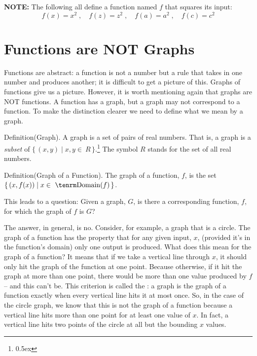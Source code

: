 {\bf NOTE:\/} The following all define a function named $f$ that squares its 
input:
$$
f(x) = x^2 \;,\quad f(z) = z^2 \;,\quad f(a) = a^2 \;,\quad f(c) = c^2 
$$

\section{Functions are NOT Graphs}
Functions are abstract: a function is not a number but a rule that takes in one number and produces another;
it is difficult to get a picture of this. Graphs of functions give us a picture. However, 
it is worth mentioning again that graphs are NOT functions. A function 
has a graph, but a graph may not correspond to a function. To make 
the distinction clearer we need to define what we mean by a graph.

\proclaim Definition(Graph). A graph is a set of pairs of real numbers.
That is, a graph is a {\it subset\/} of $\{\,(x,y)\mid x,y\in~R\,\}$.\footnote{\kern 0.5pt \raise 0.5ex \hbox{\ddag}}%
{The symbol $R$ stands for the set of all real numbers.}

\proclaim Definition(Graph of a Function). The graph of a function, $f$, 
is the set $\{\,(x,f(x)) \mid x \in~{\rm Domain}(f)\,\}$.

This leads to a question: Given a graph, $G$, is there a corresponding 
function, $f$, for which the graph of $f$ is $G$?

The answer, in general, is no. Consider, for example, a graph that 
is a circle. 
The graph of a function has the property that for any 
given input, $x$, (provided it's in the function's domain) only one output is produced. 
What does this mean for the graph
of a function? It means that if we take a vertical line through $x$, it 
should only hit the graph of the function at one point. Because otherwise, 
if it hit the graph at more than one point, there would be more than
one value produced by $f$ -- and this can't be. This criterion is called
the {\it {}\/}: a graph is the graph of a function
exactly when every vertical line hits it at most once. So, in the case of the circle
graph, we know that this is not the graph of a function because a vertical 
line hits more than one point for at least one value of $x$. In fact, a 
vertical line hits two points of the circle at all but the bounding $x$ values.

